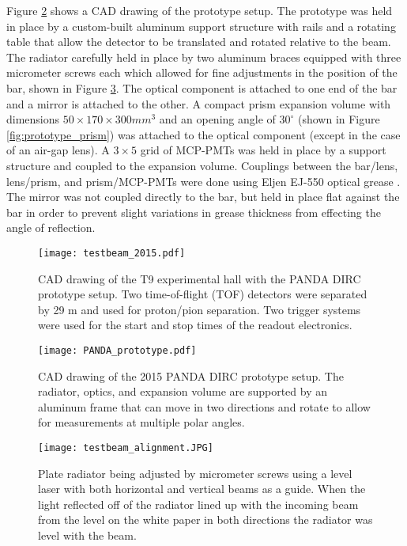 Figure \ref{fig:PANDA_prototype} shows a CAD drawing of the prototype setup. The prototype was held in place by a custom-built aluminum support structure with rails and a rotating table that allow the detector to be translated and rotated relative to the beam. The radiator carefully held in place by two aluminum braces equipped with three micrometer screws each which allowed for fine adjustments in the position of the bar, shown in Figure \ref{fig:testbeam_alignment}. The optical component is attached to one end of the bar and a mirror is attached to the other. A compact prism expansion volume with dimensions $50\times170\times300\unit{mm}^3$ and an opening angle of $30^\circ$ (shown in Figure \ref{fig:prototype_prism}) was attached to the optical component (except in the case of an air-gap lens). A $3\times5$ grid of MCP-PMTs was held in place by a support structure and coupled to the expansion volume. Couplings between the bar/lens, lens/prism, and prism/MCP-PMTs were done using Eljen EJ-550 optical grease \cite{EljenTech}. The mirror was not coupled directly to the bar, but held in place flat against the bar in order to prevent slight variations in grease thickness from effecting the angle of reflection.

\begin{figure}[ht]
	\centering
	\texttt{[image: testbeam\_2015.pdf]}
	\caption{CAD drawing of the T9 experimental hall with the PANDA DIRC prototype setup. Two time-of-flight (TOF) detectors were separated by 29 m and used for proton/pion separation. Two trigger systems were used for the start and stop times of the readout electronics.}
	\label{fig:testbeam_2015}
\end{figure}

\begin{figure}[ht]
	\centering
	\texttt{[image: PANDA\_prototype.pdf]}
	\caption{CAD drawing of the 2015 PANDA DIRC prototype setup. The radiator, optics, and expansion volume are supported by an aluminum frame that can move in two directions and rotate to allow for measurements at multiple polar angles.}
	\label{fig:PANDA_prototype}
\end{figure}

\begin{figure}[ht]
	\centering
	\texttt{[image: testbeam\_alignment.JPG]}
	\caption{Plate radiator being adjusted by micrometer screws using a level laser with both horizontal and vertical beams as a guide. When the light reflected off of the radiator lined up with the incoming beam from the level on the white paper in both directions the radiator was level with the beam.}
	\label{fig:testbeam_alignment}
\end{figure}

